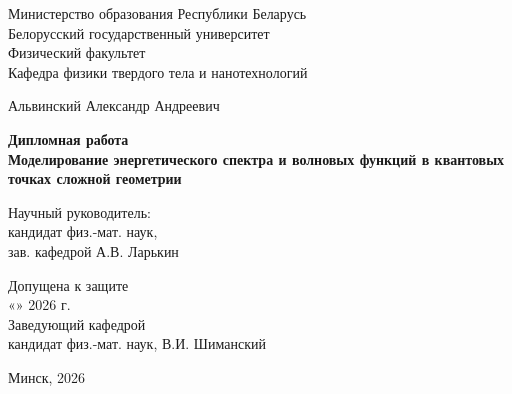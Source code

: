 \begin{titlepage}
\thispagestyle{empty}

\begin{center}
Министерство образования Республики Беларусь\\
Белорусский государственный университет\\
Физический факультет\\
Кафедра физики твердого тела и нанотехнологий
\end{center}

\vspace{1.7cm}

\begin{center}
Альвинский Александр Андреевич
\end{center}

\vspace{1.6cm}

\begin{center}
\textbf{Дипломная работа}\\[0.8cm]
\textbf{Моделирование энергетического спектра и волновых функций в квантовых точках
сложной геометрии}
\end{center}

\vspace{1.2cm}

\begin{flushright}
\begin{minipage}{0.47\textwidth}
Научный руководитель:\\
кандидат физ.-мат. наук,\\
зав. кафедрой А.В. Ларькин
\end{minipage}
\end{flushright}

\vfill

\noindent
Допущена к защите\\
«\underline{\hspace{1cm}}» \underline{\hspace{3cm}} 2026 г.\\[0.4cm]
Заведующий кафедрой\\
кандидат физ.-мат. наук, В.И. Шиманский

\vfill

\begin{center}
Минск, 2026
\end{center}

\end{titlepage}
\clearpage
